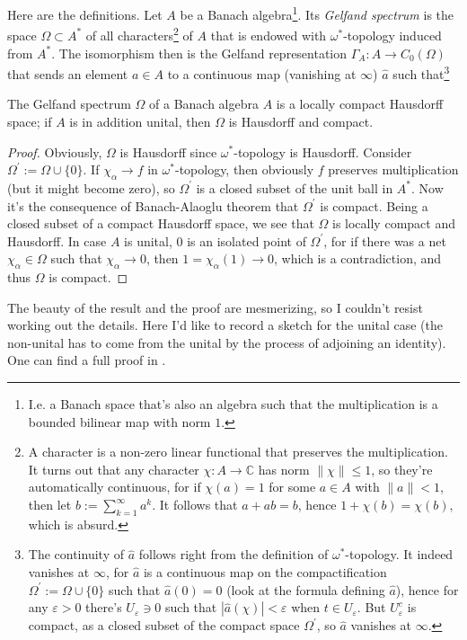 Here are the definitions. Let $A$ be a Banach algebra\footnote{I.e. a Banach space that's also an algebra such that the multiplication is a bounded bilinear map with norm $1$.}. Its \emph{Gelfand spectrum} is the space $\Omega \subset A^*$ of all characters\footnote{A character is a non-zero linear functional that preserves the multiplication. It turns out that any character $\chi : A \rightarrow \mathbb C$ has norm $\|\chi\| \leq 1$, so they're automatically continuous, for if $\chi(a) = 1$ for some $a \in A$ with $\|a\| <1$, then let $b:=\sum_{k=1}^\infty a^k$. It follows that $a + ab = b$, hence $1 + \chi(b) = \chi(b)$, which is absurd. } of $A$  that is endowed with $\omega^*$-topology induced from $A^*$. The isomorphism then is the Gelfand representation $\Gamma_A : A \rightarrow C_0(\Omega)$ that sends an element $a \in A$ to a continuous map (vanishing at $\infty$) $\hat a$ such that\footnote{The continuity of $\hat a$ follows right from the definition of $\omega^*$-topology. It indeed vanishes at $\infty$, for $\hat a$ is a continuous map on the compactification $\Omega^\prime := \Omega \cup \{0\}$ such that $\hat{a}(0) = 0$ (look at the formula defining $\hat{a}$), hence for any $\varepsilon > 0$ there's $U_{\varepsilon} \ni 0$ such that $|\hat{a}(\chi)| < \varepsilon$ when $t \in U_{\varepsilon}$. But $U_{\varepsilon}^c$ is compact, as a closed subset of the compact space $\Omega^\prime$, so $\hat a$ vanishes at $\infty$.}
\begin{proposition}
The Gelfand spectrum $\Omega$ of a Banach algebra $A$ is a locally compact Hausdorff space; if $A$ is in addition unital, then $\Omega$ is Hausdorff and compact.
\end{proposition}
\begin{proof}
Obviously, $\Omega$ is Hausdorff since $\omega^*$-topology is Hausdorff. Consider $\Omega^\prime := \Omega \cup \{0\}$. If $\chi_\alpha \rightarrow f$ in $\omega^*$-topology, then obviously $f$ preserves multiplication (but it might become zero), so $\Omega^\prime$ is a closed subset of the unit ball in $A^*$. Now it's the consequence of Banach-Alaoglu theorem that $\Omega^\prime$ is compact. Being a closed subset of a compact Hausdorff space, we see that $\Omega$ is locally compact and Hausdorff. In case $A$ is unital, $0$ is an isolated point of $\Omega^\prime$, for if there was a net $\chi_\alpha \in \Omega$ such that $\chi_\alpha \rightarrow 0$, then $1 = \chi_\alpha(1) \rightarrow 0$, which is a contradiction, and thus $\Omega$ is compact.
\end{proof}
The beauty of the result and the proof are mesmerizing, so I couldn't resist working out the details. Here I'd like to record a sketch for the unital case (the non-unital has to come from the unital by the process of adjoining an identity). One can find a full proof in \cite{arveson}.
